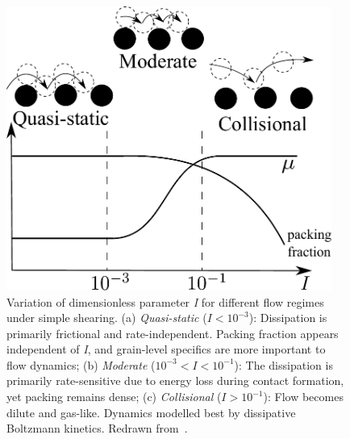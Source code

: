 \begin{figure}[tbhp]
\centering
\includegraphics[width=0.95\textwidth]{Regime}
\caption[Variation of dimensionless parameter \textit{I} for different flow 
regimes]{Variation of dimensionless parameter \textit{I} for different 
flow regimes under simple shearing. (a) \textit{Quasi-static} ($I < 10^{-3}$): 
Dissipation is primarily frictional and rate-independent. Packing fraction 
appears independent of \textit{I}, and grain-level specifics are more important 
to flow dynamics; (b) \textit{Moderate} ($10^{-3} < I < 
10^{-1}$): The dissipation is primarily rate-sensitive due to energy loss 
during contact formation, yet packing remains dense; (c) \textit{Collisional} 
($I > 10^{-1}$): Flow becomes dilute and gas-like. Dynamics modelled best by 
dissipative Boltzmann kinetics. Redrawn from~\citet{Kamrin2008}.}
\label{fig:Regime}
\end{figure}


